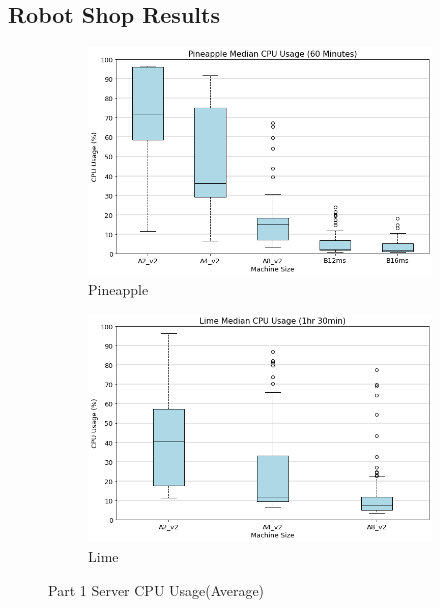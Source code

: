 \subsection{Robot Shop Results}
\begin{figure}[H]
     \centering
     \begin{subfigure}[b]{0.49\textwidth}
         \centering
         \includegraphics[width=\textwidth]{images/pineapple_cpu.png}
         \caption{Pineapple}
         \label{fig:pineapple_cpu}
     \end{subfigure}
     \hfill
     \begin{subfigure}[b]{0.49\textwidth}
         \centering
         \includegraphics[width=\textwidth]{images/lime_cpu.png}
         \caption{Lime}
         \label{fig:lime_cpu}
     \end{subfigure}
    
        \caption{Part 1 Server CPU Usage(Average)}
        \label{fig:part_1_cpu}
\end{figure}
